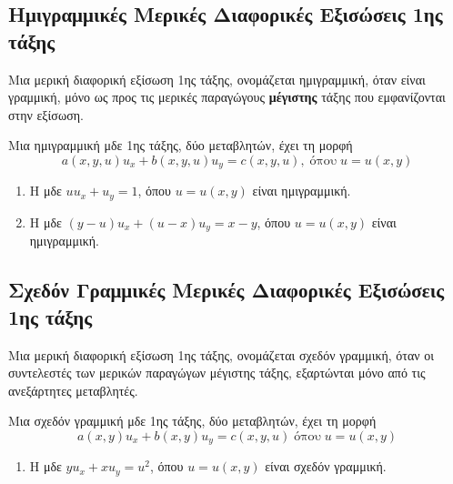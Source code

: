 \subsection*{Ημιγραμμικές Μερικές Διαφορικές Εξισώσεις 1ης τάξης}

\begin{mybox1}
  \begin{dfn}
    Μια μερική διαφορική εξίσωση 1ης τάξης, ονομάζεται \textcolor{Col1}{ημιγραμμική}, 
    όταν είναι γραμμική, μόνο ως προς τις μερικές παραγώγους \textbf{μέγιστης} τάξης που 
    εμφανίζονται στην εξίσωση.
  \end{dfn}
\end{mybox1}

\begin{rem}
  Μια ημιγραμμική μδε 1ης τάξης, δύο μεταβλητών, έχει τη μορφή
  \[ a(x,y,u)u_{x} + b(x,y,u)u_{y} = c(x,y,u), \; \text{όπου} \; u=u(x,y) \]
\end{rem}

\begin{examples} \item {}
  \begin{enumerate}
    \item Η μδε $uu_{x}+u_{y}=1$, όπου $ u=u(x,y) $  είναι ημιγραμμική.
    \item Η μδε $ (y-u)u_{x} + (u-x)u_{y} = x-y $, όπου $ u=u(x,y) $  είναι ημιγραμμική.
  \end{enumerate}
\end{examples}


\subsection*{Σχεδόν Γραμμικές Μερικές Διαφορικές Εξισώσεις 1ης τάξης}

\begin{mybox1}
  \begin{dfn}
    Μια μερική διαφορική εξίσωση 1ης τάξης, ονομάζεται 
    \textcolor{Col1}{σχεδόν γραμμική}, όταν οι συντελεστές των μερικών παραγώγων 
    μέγιστης τάξης, εξαρτώνται μόνο από τις ανεξάρτητες μεταβλητές.
  \end{dfn}
\end{mybox1}

\begin{rem}
  Μια σχεδόν γραμμική μδε 1ης τάξης, δύο μεταβλητών, έχει τη μορφή
  \[  a(x,y) u_{x} + b(x,y) u_{y} = c(x,y,u) \; \text{όπου} \; u=u(x,y) \]
\end{rem}

\begin{examples} \item {}
  \begin{enumerate}
    \item Η μδε $yu_{x}+xu_{y}=u^{2}$, όπου $ u=u(x,y) $  είναι σχεδόν γραμμική.
  \end{enumerate}
\end{examples}


